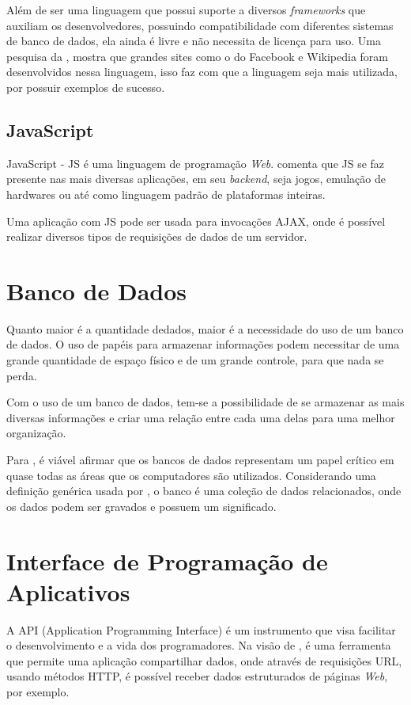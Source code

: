 Além de ser uma linguagem que possui suporte a diversos \textit{frameworks} que auxiliam os desenvolvedores, possuindo compatibilidade com diferentes sistemas de banco de dados, ela ainda é livre e não necessita de licença para uso. Uma pesquisa da \citet{w3techs2018}, mostra que grandes sites como o do Facebook e Wikipedia foram desenvolvidos nessa linguagem, isso faz com que a linguagem seja mais utilizada, por possuir exemplos de sucesso.

\subsection{JavaScript}
JavaScript - JS é uma linguagem de programação \textit{Web}. \citet{balduino2014} comenta que JS se faz presente nas mais diversas aplicações, em seu \textit{backend}, seja jogos, emulação de hardwares ou até como linguagem padrão de plataformas inteiras.

Uma aplicação com JS pode ser usada para invocações AJAX, onde é possível realizar diversos tipos de requisições de dados de um servidor.

\section{Banco de Dados}
Quanto maior é a quantidade dedados, maior é a necessidade do uso de um banco de dados. O uso de papéis para armazenar informações podem necessitar de uma grande quantidade de espaço físico e de um grande controle, para que nada se perda.

Com o uso de um banco de dados, tem-se a possibilidade de se armazenar as mais diversas informações e criar uma relação entre cada uma delas para uma melhor organização.

Para \citet{elmasri2005}, é viável afirmar que os bancos de dados representam um papel crítico em quase todas as áreas que os computadores são utilizados. Considerando uma definição genérica usada por \citet{elmasri2005}, o banco é uma coleção de dados relacionados, onde os dados podem ser gravados e possuem um significado.

\section{Interface de Programação de Aplicativos}
A API (Application Programming Interface) é um instrumento que visa facilitar o desenvolvimento e a vida dos programadores. Na visão de \citet{makice2009}, é uma ferramenta que permite uma aplicação compartilhar dados, onde através de requisições URL, usando métodos HTTP, é possível receber dados estruturados de páginas \textit{Web}, por exemplo.

